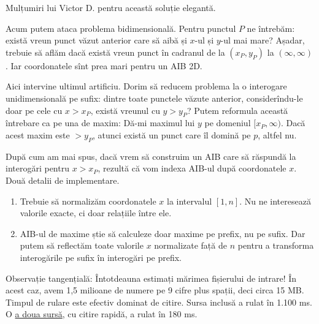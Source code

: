 \documentclass[../main.tex]{subfiles}
\begin{document}
Mulțumiri lui Victor D. pentru această soluție elegantă.

Acum putem ataca problema bidimensională. Pentru punctul $P$ ne întrebăm: există vreun punct văzut anterior care să aibă și $x$-ul și $y$-ul mai mare? Așadar, trebuie să aflăm dacă există vreun punct în cadranul de la $(x_P,y_P)$ la $(\infty,\infty)$. Iar coordonatele sînt prea mari pentru un AIB 2D.

Aici intervine ultimul artificiu. Dorim să reducem problema la o interogare unidimensională pe sufix: dintre toate punctele văzute anterior, considerîndu-le doar pe cele cu $x > x_P$, există vreunul cu $y > y_P$? Putem reformula această întrebare ca pe una de maxim: Dă-mi maximul lui $y$ pe domeniul $[x_P, \infty)$. Dacă acest maxim este  $> y_P$, atunci există un punct care îl domină pe $p$, altfel nu.

După cum am mai spus, dacă vrem să construim un AIB care să răspundă la interogări pentru $x > x_P$, rezultă că vom indexa AIB-ul după coordonatele $x$. Două detalii de implementare.

\begin{enumerate}
  \item Trebuie să normalizăm coordonatele $x$ la intervalul $[1, n]$. Nu ne interesează valorile exacte, ci doar relațiile între ele.

  \item AIB-ul de maxime știe să calculeze doar maxime pe prefix, nu pe sufix. Dar putem să reflectăm toate valorile $x$ normalizate față de $n$ pentru a transforma interogările pe sufix în interogări pe prefix.
\end{enumerate}

Observație tangențială: Întotdeauna estimați mărimea fișierului de intrare! În acest caz, avem 1,5 milioane de numere pe 9 cifre plus spații, deci circa 15 MB. Timpul de rulare este efectiv dominat de citire. Sursa inclusă a rulat în 1.100 ms. O \href{https://codeforces.com/contest/12/submission/392826861}{a doua sursă}, cu citire rapidă, a rulat în 180 ms.
\end{document}
